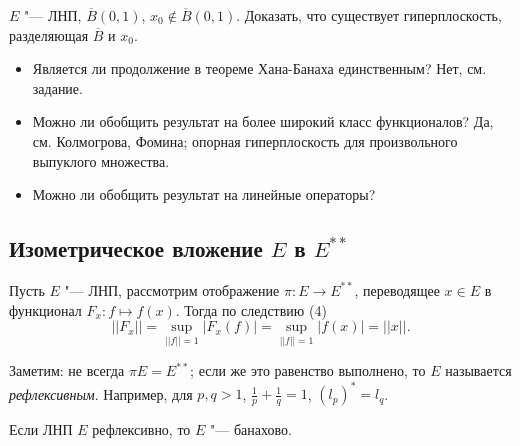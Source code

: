 \documentclass[main]{subfiles}
\begin{document}
\begin{exercise}
  $E$ "--- ЛНП, $\overline{B}(0, 1)$, $x_0 \notin \overline{B}(0, 1)$.
  Доказать, что существует гиперплоскость, разделяющая $\overline{B}$
  и $x_0$.
\end{exercise}

\begin{remark}
  \begin{itemize}
    \item Является ли продолжение в теореме Хана-Банаха
      единственным? Нет, см. задание.
    \item Можно ли обобщить результат на более широкий класс
      функционалов? Да, см. Колмогрова, Фомина;
      опорная гиперплоскость для произвольного выпуклого множества.
    \item Можно ли обобщить результат на линейные операторы?
  \end{itemize}
\end{remark}

\subsection{Изометрическое вложение $E$ в $E^{**}$}
Пусть $E$ "--- ЛНП, рассмотрим отображение $\pi : E \to E^{**}$,
переводящее $x \in E$ в функционал $F_x : f \mapsto f(x)$.
Тогда по следствию (4)
\[
  ||F_x|| = \sup_{||f|| = 1} |F_x(f)| =
  \sup_{||f|| = 1} |f(x)| = ||x||.
\]

Заметим: не всегда $\pi E = E^{**}$; если же это равенство выполнено,
то $E$ называется \emph{рефлексивным}. Например, для $p, q > 1$,
$\frac1p + \frac1q = 1$, $(l_p)^* = l_q$.

\begin{exercise}
  Если ЛНП $E$ рефлексивно, то $E$ "--- банахово.
\end{exercise}
\end{document}
